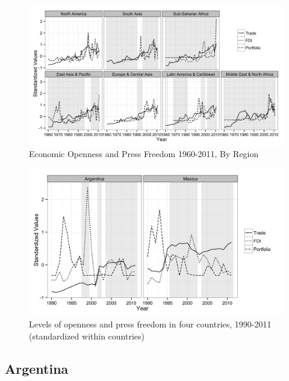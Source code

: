 \documentclass[12pt]{report}
\begin{document}
\begin{centering}

\begin{figure}
\includegraphics[scale=0.2]{article2_regions.png}
\caption{Economic Openness and Press Freedom 1960-2011, By Region}
\end{figure}

\begin{figure}
\includegraphics[scale=0.2]{article2_AM_cases.png}
\caption{Levels of openness and press freedom in four countries, 1990-2011 (standardized within countries)}
\end{figure}

\end{centering}

\subsection{Argentina}
\end{document}
